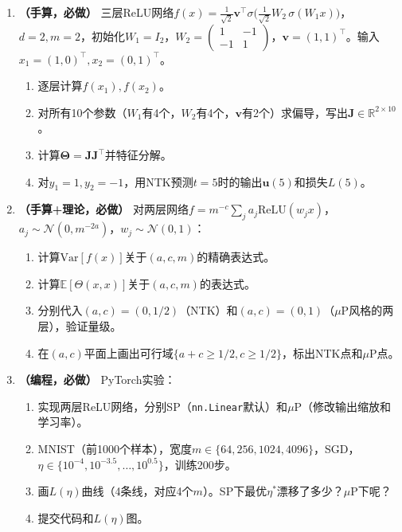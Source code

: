 \documentclass[11pt,a4paper]{article}
\newcommand{\R}{\mathbb{R}}
\newcommand{\E}{\mathbb{E}}
\newcommand{\cN}{\mathcal{N}}
\newcommand{\bTheta}{\boldsymbol{\Theta}}
\newcommand{\bu}{\mathbf{u}}
\newcommand{\bJ}{\mathbf{J}}
\newcommand{\bv}{\mathbf{v}}
\begin{document}
\begin{enumerate}[leftmargin=*,label=\textbf{题\arabic*.}]

\item \textbf{（手算，必做）} 三层ReLU网络$f(x)=\frac{1}{\sqrt{2}}\bv^\top\sigma\big(\frac{1}{\sqrt{2}}W_2\,\sigma(W_1 x)\big)$，$d=2,m=2$，初始化$W_1=I_2$，$W_2=\begin{pmatrix}1&-1\\-1&1\end{pmatrix}$，$\bv=(1,1)^\top$。输入$x_1=(1,0)^\top, x_2=(0,1)^\top$。
\begin{enumerate}[label=(\alph*)]
\item 逐层计算$f(x_1), f(x_2)$。
\item 对所有10个参数（$W_1$有4个，$W_2$有4个，$\bv$有2个）求偏导，写出$\bJ\in\R^{2\times 10}$。
\item 计算$\bTheta=\bJ\bJ^\top$并特征分解。
\item 对$y_1=1,y_2=-1$，用NTK预测$t=5$时的输出$\bu(5)$和损失$L(5)$。
\end{enumerate}

\item \textbf{（手算+理论，必做）} 对两层网络$f=m^{-c}\sum_j a_j\text{ReLU}(w_j x)$，$a_j\sim\cN(0,m^{-2a})$，$w_j\sim\cN(0,1)$：
\begin{enumerate}[label=(\alph*)]
\item 计算$\text{Var}[f(x)]$关于$(a,c,m)$的精确表达式。
\item 计算$\E[\Theta(x,x)]$关于$(a,c,m)$的表达式。
\item 分别代入$(a,c)=(0,1/2)$（NTK）和$(a,c)=(0,1)$（$\mu$P风格的两层），验证量级。
\item 在$(a,c)$平面上画出可行域$\{a+c\ge 1/2, c\ge 1/2\}$，标出NTK点和$\mu$P点。
\end{enumerate}

\item \textbf{（编程，必做）} PyTorch实验：
\begin{enumerate}[label=(\alph*)]
\item 实现两层ReLU网络，分别SP（\texttt{nn.Linear}默认）和$\mu$P（修改输出缩放和学习率）。
\item MNIST（前1000个样本），宽度$m\in\{64,256,1024,4096\}$，SGD，$\eta\in\{10^{-4},10^{-3.5},\dots,10^{0.5}\}$，训练200步。
\item 画$L(\eta)$曲线（4条线，对应4个$m$）。SP下最优$\eta^*$漂移了多少？$\mu$P下呢？
\item 提交代码和$L(\eta)$图。
\end{enumerate}


\end{enumerate}
\end{document}
